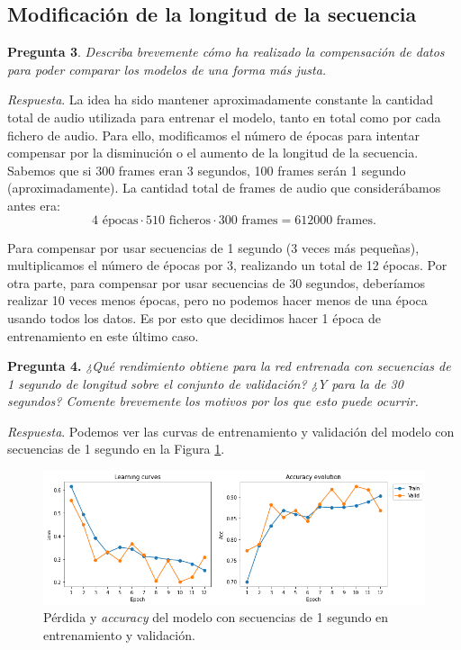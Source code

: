 \documentclass[11pt]{article}
\begin{document}
\subsection{Modificación de la longitud de la secuencia}

\textbf{Pregunta 3}. \textit{Describa brevemente cómo ha realizado la compensación de datos para poder comparar los modelos de una forma más justa.}

\textit{Respuesta}. La idea ha sido mantener aproximadamente constante la cantidad total de audio utilizada para entrenar el modelo, tanto en total como por cada fichero de audio. Para ello, modificamos el número de épocas para intentar compensar por la disminución o el aumento de la longitud de la secuencia. Sabemos que si 300 frames eran 3 segundos, 100 frames serán 1 segundo (aproximadamente). La cantidad total de frames de audio que considerábamos antes era:
$$
4 \text{ épocas} \cdot 510 \text{ ficheros} \cdot 300 \text{ frames} = 612000 \text{ frames}.
$$

Para compensar por usar secuencias de 1 segundo (3 veces más pequeñas), multiplicamos el número de épocas por 3, realizando un total de 12 épocas. Por otra parte, para compensar por usar secuencias de 30 segundos, deberíamos realizar 10 veces menos épocas, pero no podemos hacer menos de una época usando todos los datos. Es por esto que decidimos hacer 1 época de entrenamiento en este último caso.

\textbf{Pregunta 4.} \textit{¿Qué rendimiento obtiene para la red entrenada con secuencias de 1 segundo de longitud sobre el conjunto de validación? ¿Y para la de 30 segundos? Comente brevemente los motivos por los que esto puede ocurrir. }

\textit{Respuesta}. Podemos ver las curvas de entrenamiento y validación del modelo con secuencias de 1 segundo en la Figura \ref{fig:2}.

\begin{figure}[h!]
  \centering
  \includegraphics[width=\textwidth]{img/2_learning_curves}
  \caption{Pérdida y \textit{accuracy} del modelo con secuencias de 1 segundo en entrenamiento y validación.}
  \label{fig:2}
\end{figure}
\end{document}
